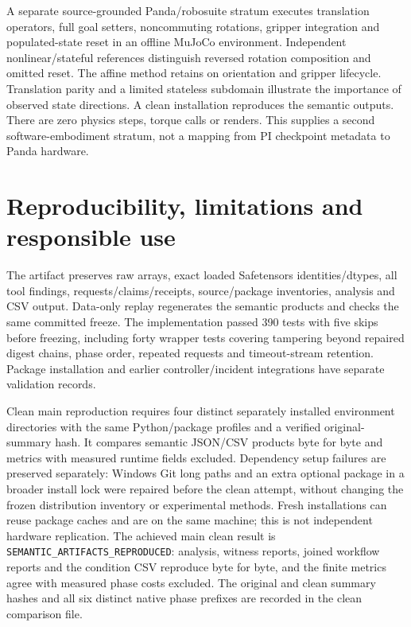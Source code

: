A separate source-grounded Panda/robosuite stratum executes translation operators, full goal setters, noncommuting rotations, gripper integration and populated-state reset in an offline MuJoCo environment. Independent nonlinear/stateful references distinguish reversed rotation composition and omitted reset. The affine method retains \UNKNOWN{} on orientation and gripper lifecycle. Translation parity and a limited stateless subdomain illustrate the importance of observed state directions. A clean installation reproduces the semantic outputs. There are zero physics steps, torque calls or renders. This supplies a second software-embodiment stratum, not a mapping from PI checkpoint metadata to Panda hardware.

\section{Reproducibility, limitations and responsible use}
The artifact preserves raw arrays, exact loaded Safetensors identities/dtypes, all tool findings, requests/claims/receipts, source/package inventories, analysis and CSV output. Data-only replay regenerates the semantic products and checks the same committed freeze. The implementation passed 390 tests with five skips before freezing, including forty wrapper tests covering tampering beyond repaired digest chains, phase order, repeated requests and timeout-stream retention. Package installation and earlier controller/incident integrations have separate validation records.

Clean main reproduction requires four distinct separately installed environment directories with the same Python/package profiles and a verified original-summary hash. It compares semantic JSON/CSV products byte for byte and metrics with measured runtime fields excluded. Dependency setup failures are preserved separately: Windows Git long paths and an extra optional package in a broader install lock were repaired before the clean attempt, without changing the frozen distribution inventory or experimental methods. Fresh installations can reuse package caches and are on the same machine; this is not independent hardware replication. The achieved main clean result is \texttt{SEMANTIC\_ARTIFACTS\_REPRODUCED}: analysis, witness reports, joined workflow reports and the condition CSV reproduce byte for byte, and the finite metrics agree with measured phase costs excluded. The original and clean summary hashes and all six distinct native phase prefixes are recorded in the clean comparison file.

